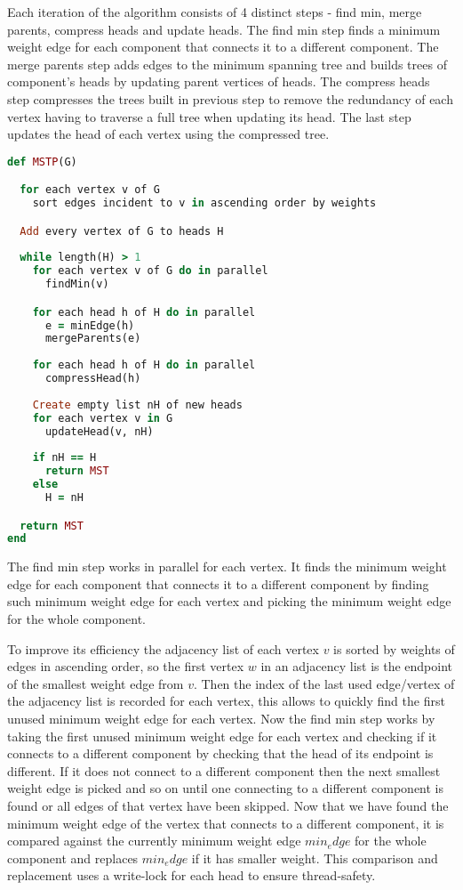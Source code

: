 \documentclass{report}
\theoremstyle{plain}
\theoremstyle{definition}
\theoremstyle{remark}
\begin{document}
Each iteration of the algorithm consists of 4 distinct steps - find min, merge parents, compress heads and update heads. The find min step finds a minimum weight edge for each component that connects it to a different component. The merge parents step adds edges to the minimum spanning tree and builds trees of component's heads by updating parent vertices of heads. The compress heads step compresses the trees built in previous step to remove the redundancy of each vertex having to traverse a full tree when updating its head. The last step updates the head of each vertex using the compressed tree.

\begin{lstlisting}[language=Ruby]
def MSTP(G)

  for each vertex v of G
    sort edges incident to v in ascending order by weights

  Add every vertex of G to heads H
  
  while length(H) > 1
    for each vertex v of G do in parallel
      findMin(v)

    for each head h of H do in parallel
      e = minEdge(h)
      mergeParents(e)
  
    for each head h of H do in parallel
      compressHead(h)
    
    Create empty list nH of new heads
    for each vertex v in G
      updateHead(v, nH)
    
    if nH == H
      return MST
    else
      H = nH

  return MST
end
\end{lstlisting}

The find min step works in parallel for each vertex. It finds the minimum weight edge for each component that connects it to a different component by finding such minimum weight edge for each vertex and picking the minimum weight edge for the whole component.

To improve its efficiency the adjacency list of each vertex $v$ is sorted by weights of edges in ascending order, so the first vertex $w$ in an adjacency list is the endpoint of the smallest weight edge from $v$. Then the index of the last used edge/vertex of the adjacency list is recorded for each vertex, this allows to quickly find the first unused minimum weight edge for each vertex. Now the find min step works by taking the first unused minimum weight edge for each vertex and checking if it connects to a different component by checking that the head of its endpoint is different. If it does not connect to a different component then the next smallest weight edge is picked and so on until one connecting to a different component is found or all edges of that vertex have been skipped. Now that we have found the minimum weight edge of the vertex that connects to a different component, it is compared against the currently minimum weight edge $min_edge$ for the whole component and replaces $min_edge$ if it has smaller weight. This comparison and replacement uses a write-lock for each head to ensure thread-safety. 
\end{document}
